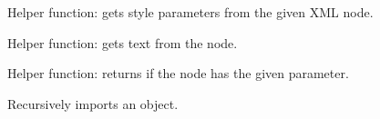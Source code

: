 Helper function: gets style parameters from the given XML node.

\label{wxrichtextxmlhandlergettext}


Helper function: gets text from the node.

\label{wxrichtextxmlhandlerhasparam}


Helper function: returns \true if the node has the given parameter.

\label{wxrichtextxmlhandlerimportxml}


Recursively imports an object.

